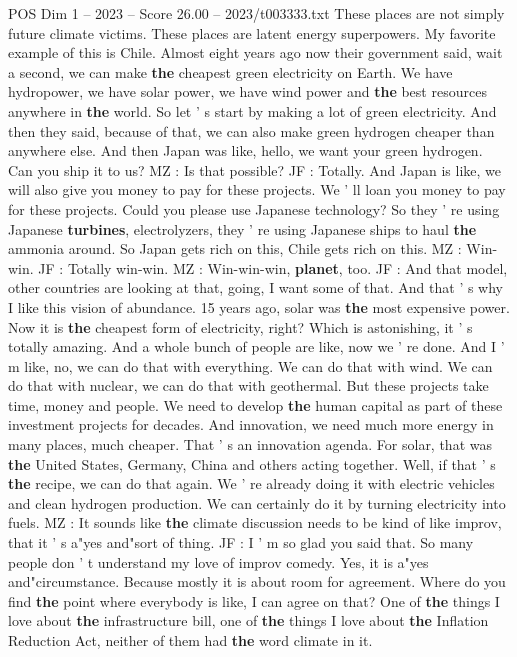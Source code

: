 \begin{textsample}{POS Dim 1 – 2023 – Score 26.00 – 2023/t003333.txt}
These places are not simply future climate victims.
These places are latent energy superpowers.
My favorite example of this is Chile.
Almost eight years ago now their government said, wait a second, we can make \textbf{the} cheapest green electricity on Earth.
We have hydropower, we have solar power, we have wind power and \textbf{the} best resources anywhere in \textbf{the} world.
So let ' s start by making a lot of green electricity.
And then they said, because of that, we can also make green hydrogen cheaper than anywhere else.
And then Japan was like, hello, we want your green hydrogen.
Can you ship it to us?
MZ : Is that possible?
JF : Totally.
And Japan is like, we will also give you money to pay for these projects.
We ' ll loan you money to pay for these projects.
Could you please use Japanese technology?
So they ' re using Japanese \textbf{turbines}, electrolyzers, they ' re using Japanese ships to haul \textbf{the} ammonia around.
So Japan gets rich on this, Chile gets rich on this.
MZ : Win-win.
JF : Totally win-win.
MZ : Win-win-win, \textbf{planet}, too.
JF : And that model, other countries are looking at that, going, I want some of that.
And that ' s why I like this vision of abundance. 15 years ago, solar was \textbf{the} most expensive power.
Now it is \textbf{the} cheapest form of electricity, right?
Which is astonishing, it ' s totally amazing.
And a whole bunch of people are like, now we ' re done.
And I ' m like, no, we can do that with everything.
We can do that with wind.
We can do that with nuclear, we can do that with geothermal.
But these projects take time, money and people.
We need to develop \textbf{the} human capital as part of these investment projects for decades.
And innovation, we need much more energy in many places, much cheaper.
That ' s an innovation agenda.
For solar, that was \textbf{the} United States, Germany, China and others acting together.
Well, if that ' s \textbf{the} recipe, we can do that again.
We ' re already doing it with electric vehicles and clean hydrogen production.
We can certainly do it by turning electricity into fuels.
MZ : It sounds like \textbf{the} climate discussion needs to be kind of like improv, that it ' s a"yes and"sort of thing.
JF : I ' m so glad you said that.
So many people don ' t understand my love of improv comedy.
Yes, it is a"yes and"circumstance.
Because mostly it is about room for agreement.
Where do you find \textbf{the} point where everybody is like, I can agree on that?
One of \textbf{the} things I love about \textbf{the} infrastructure bill, one of \textbf{the} things I love about \textbf{the} Inflation Reduction Act, neither of them had \textbf{the} word climate in it.

\end{textsample}
